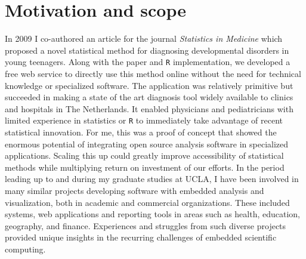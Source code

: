 


\section{Motivation and scope}

In 2009 I co-authored an article for the journal \emph{Statistics in Medicine} \citep{van2009stage} which proposed a novel statistical method for diagnosing developmental disorders in young teenagers. Along with the paper and \texttt{R} implementation, we developed a free web service to directly use this method online without the need for technical knowledge or specialized software. The application was relatively primitive but succeeded in making a state of the art diagnosis tool widely available to clinics and hospitals in The Netherlands. It enabled physicians and pediatricians with limited experience in statistics or \texttt{R} to immediately take advantage of recent statistical innovation. For me, this was a proof of concept that showed the enormous potential of integrating open source analysis software in specialized applications. Scaling this up could greatly improve accessibility of statistical methods while multiplying return on investment of our efforts. In the period leading up to and during my graduate studies at UCLA, I have been involved in many similar projects developing software with embedded analysis and visualization, both in academic and commercial organizations. These included systems, web applications and reporting tools in areas such as health, education, geography, and finance. Experiences and struggles from such diverse projects provided unique insights in the recurring challenges of embedded scientific computing.%

